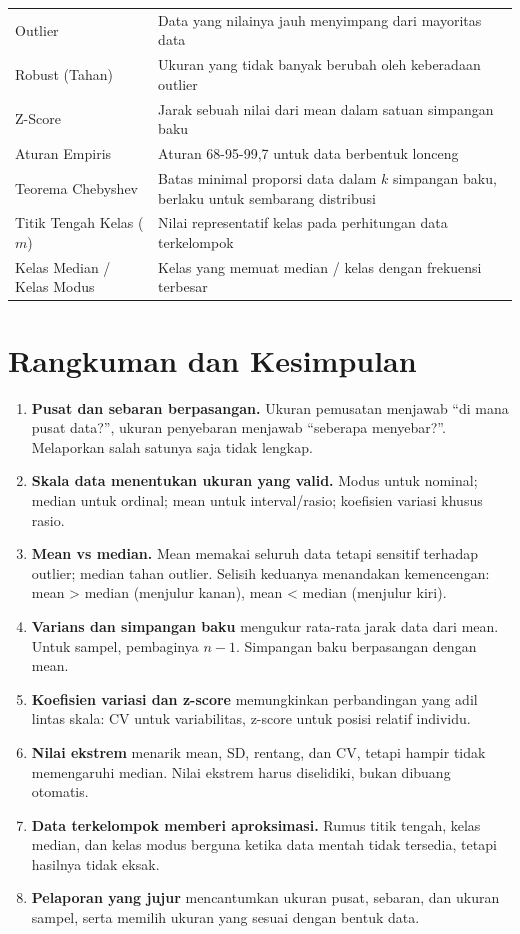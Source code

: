 \documentclass[
  indonesian,
  letterpaper,
]{book}
\providecommand{\tightlist}{%
  \setlength{\itemsep}{0pt}\setlength{\parskip}{0pt}}
\begin{document}
{\begin{longtable}[]{@{}
  >{\raggedright\arraybackslash}p{}
  >{\raggedright\arraybackslash}p{}@{}}
Outlier & Data yang nilainya jauh menyimpang dari mayoritas data \\
Robust (Tahan) & Ukuran yang tidak banyak berubah oleh keberadaan
outlier \\
Z-Score & Jarak sebuah nilai dari mean dalam satuan simpangan baku \\
Aturan Empiris & Aturan 68-95-99,7 untuk data berbentuk lonceng \\
Teorema Chebyshev & Batas minimal proporsi data dalam \(k\) simpangan
baku, berlaku untuk sembarang distribusi \\
Titik Tengah Kelas (\(m\)) & Nilai representatif kelas pada perhitungan
data terkelompok \\
Kelas Median / Kelas Modus & Kelas yang memuat median / kelas dengan
frekuensi terbesar \\
\end{longtable}
}

\section{Rangkuman dan Kesimpulan}\label{rangkuman-dan-kesimpulan-4}

\begin{enumerate}
\def\labelenumi{\arabic{enumi}.}
\tightlist
\item
  \textbf{Pusat dan sebaran berpasangan.} Ukuran pemusatan menjawab ``di
  mana pusat data?'', ukuran penyebaran menjawab ``seberapa menyebar?''.
  Melaporkan salah satunya saja tidak lengkap.
\item
  \textbf{Skala data menentukan ukuran yang valid.} Modus untuk nominal;
  median untuk ordinal; mean untuk interval/rasio; koefisien variasi
  khusus rasio.
\item
  \textbf{Mean vs median.} Mean memakai seluruh data tetapi sensitif
  terhadap outlier; median tahan outlier. Selisih keduanya menandakan
  kemencengan: mean \textgreater{} median (menjulur kanan), mean
  \textless{} median (menjulur kiri).
\item
  \textbf{Varians dan simpangan baku} mengukur rata-rata jarak data dari
  mean. Untuk sampel, pembaginya \(n-1\). Simpangan baku berpasangan
  dengan mean.
\item
  \textbf{Koefisien variasi dan z-score} memungkinkan perbandingan yang
  adil lintas skala: CV untuk variabilitas, z-score untuk posisi relatif
  individu.
\item
  \textbf{Nilai ekstrem} menarik mean, SD, rentang, dan CV, tetapi
  hampir tidak memengaruhi median. Nilai ekstrem harus diselidiki, bukan
  dibuang otomatis.
\item
  \textbf{Data terkelompok memberi aproksimasi.} Rumus titik tengah,
  kelas median, dan kelas modus berguna ketika data mentah tidak
  tersedia, tetapi hasilnya tidak eksak.
\item
  \textbf{Pelaporan yang jujur} mencantumkan ukuran pusat, sebaran, dan
  ukuran sampel, serta memilih ukuran yang sesuai dengan bentuk data.
\end{enumerate}
\end{document}
